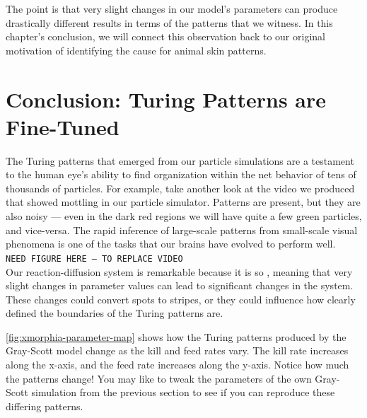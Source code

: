 The point is that very slight changes in our model's parameters can produce drastically different results in terms of the patterns that we witness. In this chapter's conclusion, we will connect this observation back to our original motivation of identifying the cause for animal skin patterns.\\

\FloatBarrier
{}

\section{Conclusion: Turing Patterns are Fine-Tuned}
\label{sec:conclusion:_turing_patterns_are_fine-tuned}


The Turing patterns that emerged from our particle simulations are a testament to the human eye's ability to find organization within the net behavior of tens of thousands of particles. For example, take another look at the video we produced that showed mottling in our particle simulator. Patterns are present, but they are also noisy --- even in the dark red regions we will have quite a few green particles, and vice-versa. The rapid inference of large-scale patterns from small-scale visual phenomena is one of the tasks that our brains have evolved to perform well.\\

\texttt{NEED FIGURE HERE -- TO REPLACE VIDEO}\\

Our reaction-diffusion system is remarkable because it is so , meaning that very slight changes in parameter values can lead to significant changes in the system. These changes could convert spots to stripes, or they could influence how clearly defined the boundaries of the Turing patterns are.

\autoref{fig:xmorphia-parameter-map} shows how the Turing patterns produced by the Gray-Scott model change as the kill and feed rates vary. The kill rate increases along the x-axis, and the feed rate increases along the y-axis. Notice how much the patterns change! You may like to tweak the parameters of the own Gray-Scott simulation from the previous section to see if you can reproduce these differing patterns.\\

